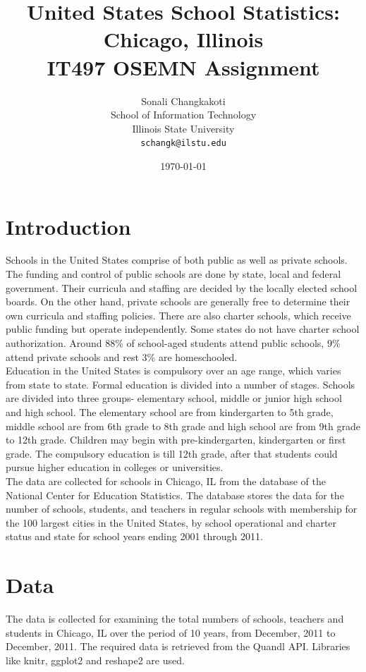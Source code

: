 \documentclass{article}\usepackage[]{graphicx}\usepackage[]{color}
\begin{document}
\title {\textbf{United States School Statistics: Chicago, Illinois}
\\ IT497 OSEMN Assignment}
\author { Sonali Changkakoti
\\ School of Information Technology 
\\ Illinois State University
\\
\texttt{schangk@ilstu.edu}}
\date{\today} 
\maketitle


\section{Introduction}
Schools in the United States comprise of both public as well as private schools. The funding and control of public schools are done by state, local and federal government. Their curricula and staffing are decided by the locally elected school boards. On the other hand, private schools are generally free to determine their own curricula and staffing policies. There are also charter schools, which receive public funding but operate independently. Some states do not have charter school authorization. Around 88\% of school-aged students attend public schools, 9\% attend private schools and rest 3\% are homeschooled. 
\\ Education in the United States is compulsory over an age range, which varies from state to state.  Formal education is divided into a number of stages. Schools are divided into three groups- elementary school, middle or junior high school and high school. The elementary school are from kindergarten to 5th grade, middle school are from 6th grade to 8th grade and high school are from 9th grade to 12th grade. Children may begin with pre-kindergarten, kindergarten or first grade. The compulsory education is till 12th grade, after that students could pursue higher education in colleges or universities.  
\\ The data are collected for schools in Chicago, IL from the database of the National Center for Education Statistics. The database stores the data for the number of schools, students, and teachers in regular schools with membership for the 100 largest cities in the United States, by school operational and charter status and state for school years ending 2001 through 2011. 

\section {Data}
The data is collected for examining the total numbers of schools, teachers and students in Chicago, IL over the period of 10 years, from December, 2011 to December, 2011. The required data is retrieved from the Quandl API. Libraries like knitr, ggplot2 and reshape2 are used.
\end{document}
